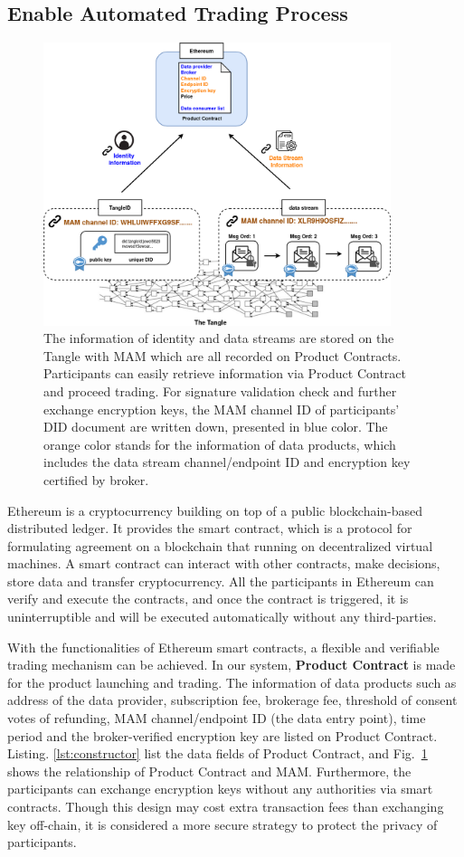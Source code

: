 \documentclass[conference]{IEEEtran}
\begin{document}
\subsection{Enable Automated Trading Process}
\begin{figure}[t]
    \centering
    \includegraphics[width=4in]{smart_contract_mam}
    \caption{The information of identity and data streams are stored on the Tangle with MAM which are all recorded on Product Contracts. Participants can easily retrieve information via Product Contract and proceed trading. For signature validation check and further exchange encryption keys, the MAM channel ID of participants' DID document  are written down, presented in blue color. The orange color stands for the information of data products, which includes the data stream channel/endpoint ID and encryption key certified by broker.}
    \label{fig:smart_contract_mam}
\end{figure}

Ethereum is a cryptocurrency building on top of a public blockchain-based distributed ledger. It provides the smart contract, which is a protocol for formulating agreement on a blockchain that running on decentralized virtual machines. A smart contract can interact with other contracts, make decisions, store data and transfer cryptocurrency. All the participants in Ethereum can verify and execute the contracts, and once the contract is triggered, it is uninterruptible and will be executed automatically without any third-parties. 

With the functionalities of Ethereum smart contracts, a flexible and verifiable trading mechanism can be achieved. In our system, \textbf{Product Contract} is made for the product launching and trading. The information of data products such as address of the data provider, subscription fee, brokerage fee, threshold of consent votes of refunding, MAM channel/endpoint ID (the data entry point), time period and the broker-verified encryption key are listed on Product Contract. Listing. \ref{lst:constructor} list the data fields of Product Contract, and Fig.~\ref{fig:smart_contract_mam} shows the relationship of Product Contract and MAM. Furthermore, the participants can exchange encryption keys without any authorities via smart contracts. Though this design may cost extra transaction fees than exchanging key off-chain, it is considered a more secure strategy to protect the privacy of participants.
\end{document}
